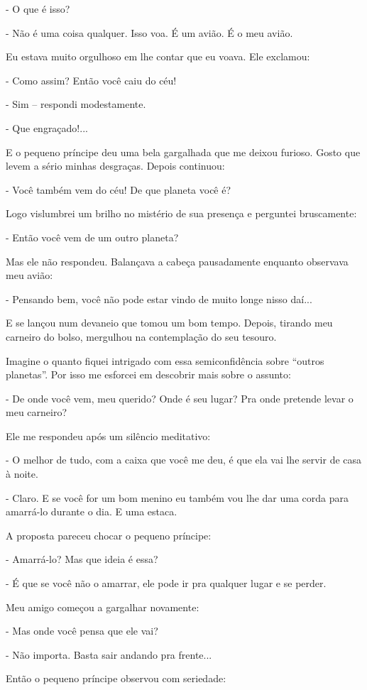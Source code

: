 \begin{Parallel}[p]{}{}
{- O que é isso?

- Não é uma coisa qualquer. Isso voa. É um avião. É o meu avião.

Eu estava muito orgulhoso em lhe contar que eu voava. Ele exclamou:

- Como assim? Então você caiu do céu!

- Sim -- respondi modestamente.

- Que engraçado!...

E o pequeno príncipe deu uma bela gargalhada que me deixou furioso.
Gosto que levem a sério minhas desgraças. Depois continuou:

- Você também vem do céu! De que planeta você é?

Logo vislumbrei um brilho no mistério de sua presença e perguntei
bruscamente:

- Então você vem de um outro planeta?

Mas ele não respondeu. Balançava a cabeça pausadamente enquanto
observava meu avião:

- Pensando bem, você não pode estar vindo de muito longe nisso daí...

E se lançou num devaneio que tomou um bom tempo. Depois, tirando meu
carneiro do bolso, mergulhou na contemplação do seu tesouro.

Imagine o quanto fiquei intrigado com essa semiconfidência sobre
``outros planetas''. Por isso me esforcei em descobrir mais sobre o
assunto:

- De onde você vem, meu querido? Onde é seu lugar? Pra onde pretende
levar o meu carneiro?

Ele me respondeu após um silêncio meditativo:

- O melhor de tudo, com a caixa que você me deu, é que ela vai lhe
servir de casa à noite.

- Claro. E se você for um bom menino eu também vou lhe dar uma corda
para amarrá-lo durante o dia. E uma estaca.

A proposta pareceu chocar o pequeno príncipe:

- Amarrá-lo? Mas que ideia é essa?

- É que se você não o amarrar, ele pode ir pra qualquer lugar e se
perder.

Meu amigo começou a gargalhar novamente:

- Mas onde você pensa que ele vai?

- Não importa. Basta sair andando pra frente...

Então o pequeno príncipe observou com seriedade:

}
\end{Parallel}

